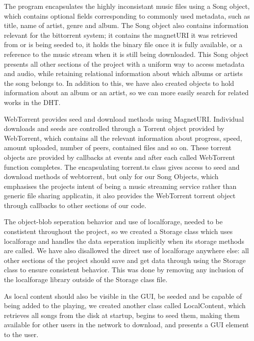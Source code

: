 The program encapsulates the highly inconsistant music files using a Song object,
which contains optional fields corresponding to commonly used metadata, 
such as title, name of artist, genre and album. 
The Song object also contains information relevant for the bittorrent system; 
it contains the magnetURI it was retrieved from or is being seeded to, 
it holds the binary file once it is fully available, 
or a reference to the music stream when it is still being downloaded.
This Song object presents all other sections of the project with a uniform way to access metadata and audio, 
while retaining relational information about which albums or artists the song belongs to. In addition to this, 
we have also created objects to hold information about an album or an artist, 
so we can more easily search for related works in the DHT.
\newline

WebTorrent provides seed and download methods using MagnetURI.
Individual downloads and seeds are controlled through a Torrent object provided by WebTorrent,
which contains all the relevant information about progress, 
speed, amount uploaded, number of peers, contained files and so on.
These torrent objects are provided by callbacks at events
and after each called WebTorrent function completes.
The encapsulating torrent.ts class gives access to seed and download methods of webtorrent, 
but only for our Song Objects, which emphasises the projects intent of being a music streaming service 
rather than generic file sharing applicatin, 
it also provides the WebTorrent torrent object through callbacks to other sections of our code.
\newline

The object-blob seperation behavior and use of localforage,
needed to be constistent throughout the project, 
so we created a Storage class which uses localforage and handles the data seperation implicitly when its storage methods are called.
We have also disallowed the direct use of localforage anywhere else: all other sections of the project should save and get data through using the Storage class to ensure consistent behavior. 
This was done by removing any inclusion of the localforage library outside of the Storage class file.

As local content should also be visible in the GUI, 
be seeded and be capable of being added to the playing,
we created another class called LocalContent,
which retrieves all songs from the disk at startup,
begins to seed them, making them available for other users in the network to download,
and presents a GUI element to the user.
